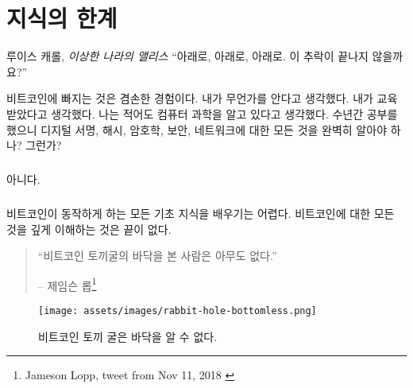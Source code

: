 \chapter{지식의 한계}
\label{les:7}

\begin{chapquote}{루이스 캐롤, \textit{이상한 나라의 앨리스}}
	\enquote{아래로, 아래로, 아래로. 이 추락이 끝나지 않을까요?}
\end{chapquote}

비트코인에 빠지는 것은 겸손한 경험이다. 
내가 무언가를 안다고 생각했다. 
내가 교육받았다고 생각했다. 
나는 적어도 컴퓨터 과학을 알고 있다고 생각했다. 
수년간 공부를 했으니 디지털 서명,
해시, 암호학, 보안, 네트워크에 대한 모든 것을 완벽히 알아야 하나? 그런가?

\paragraph{}
아니다.

\paragraph{}
비트코인이 동작하게 하는 모든 기초 지식을 배우기는 어렵다. 
비트코인에 대한 모든 것을 깊게 이해하는 것은 끝이 없다.

\begin{quotation}\begin{samepage}
		\enquote{비트코인 토끼굴의 바닥을 본 사람은 아무도 없다.}
		\begin{flushright} -- 제임슨 롭\footnote{Jameson Lopp, tweet from Nov 11, 2018 \cite{lopp-tweet}}
\end{flushright}\end{samepage}\end{quotation}

\begin{figure}
	\centering
	\texttt{[image: assets/images/rabbit-hole-bottomless.png]}
	\caption{비트코인 토끼 굴은 바닥을 알 수 없다.}
	\label{fig:rabbit-hole-bottomless}
\end{figure}

